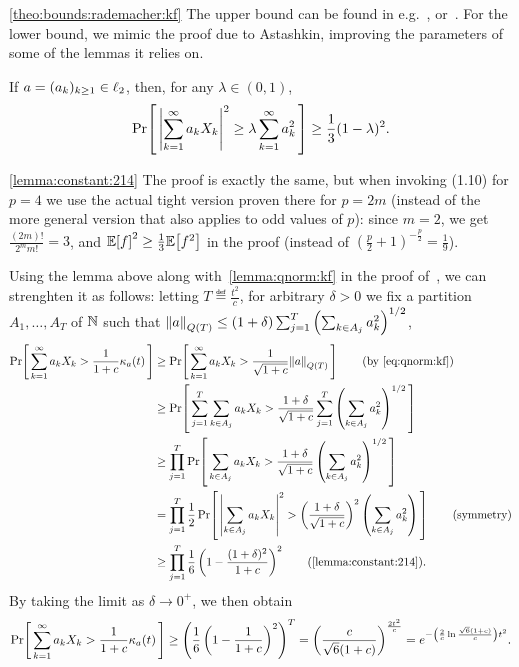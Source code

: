 \begin{proofof}{\cref{theo:bounds:rademacher:kf}}
The upper bound can be found in e.g.~\cite{MS:90}, or~\cite[Theorem 2.2]{Astashkin:2010}. For the lower bound, we mimic the proof due to Astashkin, improving the parameters of some of the lemmas it relies on.

\begin{lemma}\label{lemma:constant:214}
  If $a=(a_k)_{k\geq 1}\in\lp[2]$, then, for any $\lambda\in(0,1)$,
  \begin{equation}
    \probaOf{ \abs{ \sum_{k=1}^\infty a_k X_k }^2 \geq \lambda \sum_{k=1}^\infty a_k^2 } \geq \frac{1}{3}(1-\lambda)^2.
  \end{equation}
\end{lemma}
\begin{proofof}{\cref{lemma:constant:214}}
The proof is exactly the same, but when invoking (1.10) for $p=4$ we use the actual tight version proven there for $p=2m$ (instead of the more general version that also applies to odd values of $p$): since $m=2$, we get $\frac{(2m)!}{2^m m!} = 3$, and $\expect{f}^2 \geq \frac{1}{3} \expect{f^2}$ in the proof (instead of $(\frac{p}{2}+1)^{-\frac{p}{2}}=\frac{1}{9}$).
\end{proofof}

Using the lemma above along with~\cref{lemma:qnorm:kf} in the proof of~\cite[Theorem 2.2]{Astashkin:2010}, we can strenghten it as follows: letting $T\eqdef \frac{t^2}{c}$, for arbitrary $\delta>0$ we fix a partition $A_1,\dots,A_{T}$ of $\N$ such that $\norm{a}_{Q(T)} \leq (1+\delta) \sum_{j=1}^{T} \left( \sum_{k\in A_j} a_k^2\right)^{1/2}$,
\begin{align*}
  \probaOf{ \sum_{k=1}^\infty a_k X_k > \frac{1}{1+c} \kf{a}(t) } 
  &\geq \probaOf{ \sum_{k=1}^\infty a_k X_k > \frac{1}{\sqrt{1+c}} \norm{a}_{Q(T)} }  \tag{by~\eqref{eq:qnorm:kf}} \\
  &\geq \probaOf{  \sum_{j=1}^{T} \sum_{k\in A_j} a_k X_k > \frac{1+\delta}{\sqrt{1+c}} \sum_{j=1}^{T} \left( \sum_{k\in A_j} a_k^2\right)^{1/2} }\\
  &\geq \prod_{j=1}^{T} \probaOf{  \sum_{k\in A_j} a_k X_k > \frac{1+\delta}{\sqrt{1+c}} \left( \sum_{k\in A_j} a_k^2\right)^{1/2} } \\
  &= \prod_{j=1}^{T} \frac{1}{2}\probaOf{  \abs{ \sum_{k\in A_j} a_k X_k }^2 > \left(\frac{1+\delta}{\sqrt{1+c}}\right)^2 \left( \sum_{k\in A_j} a_k^2\right) } \tag{symmetry} \\
  &\geq \prod_{j=1}^{T} \frac{1}{6}\left(1-\frac{(1+\delta)^2}{1+c}\right)^2 \tag{\cref{lemma:constant:214}}.
\end{align*}
By taking the limit as $\delta\to 0^+$, we then obtain
\begin{align}\label{eq:intermed:result:integer}
  \probaOf{ \sum_{k=1}^\infty a_k X_k > \frac{1}{1+c} \kf{a}(t) } \geq \left(\frac{1}{6}\left(1-\frac{1}{1+c}\right)^2\right)^{T}
  = \left(\frac{c}{\sqrt{6}(1+c)}\right)^{\frac{2t^2}{c}}
  = e^{-\left( \frac{2}{c}\ln\frac{\sqrt{6}(1+c)}{c}\right) t^2 }.
\end{align}


\end{proofof}
